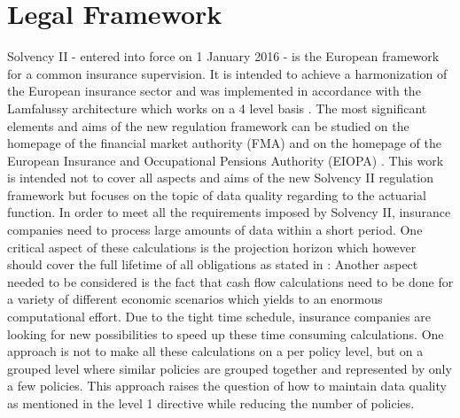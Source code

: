 \section{Legal Framework}

Solvency II - entered into force on 1 January 2016 - is the European framework for a common insurance supervision. It is intended to achieve a harmonization of the European insurance sector and was implemented in accordance with the Lamfalussy architecture which works on a 4 level basis \cite{Lamfalussy_homepage}. The most significant elements and aims of the new regulation framework can be studied on the homepage of the financial market authority (FMA) \cite{FMA_homepage} and on the homepage of the  European Insurance and Occupational Pensions Authority (EIOPA) \cite{EIOPA_homepage}. This work is intended not to cover all aspects and aims of the new Solvency II regulation framework but focuses on the topic of data quality regarding to the actuarial function. In order to meet all the requirements imposed by Solvency II, insurance companies need to process large amounts of data within a short period. One critical aspect of these calculations is the projection horizon which however should cover the full lifetime of all obligations as stated in \cite{Time_horizon}:
Another aspect needed to be considered is the fact that cash flow calculations need to be done for a variety of different economic scenarios which yields to an enormous computational effort. Due to the tight time schedule, insurance companies are looking for new possibilities to speed up these time consuming calculations. One approach is not to make all these calculations on a per policy level, but on a grouped level where similar policies are grouped together and represented by only a few policies. This approach raises the question of how to maintain data quality as mentioned in the level 1 directive \cite{Directive} while reducing the number of policies.

